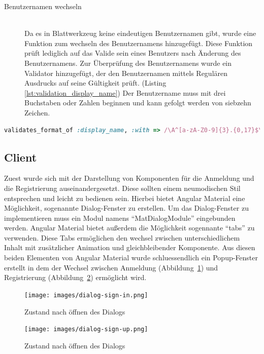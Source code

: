 \documentclass[paper=a4,fontsize=12pt,parskip=half]{scrartcl}
\begin{document}
\begin{description}
		\item[Benutzernamen wechseln]\hfill\\
		Da es in Blattwerkzeug keine eindeutigen Benutzernamen gibt, wurde eine Funktion zum wechseln des Benutzernamens hinzugefügt. Diese Funktion prüft lediglich auf das Valide sein eines Benutzers nach Änderung des Benutzernamens. Zur Überprüfung des Benutzernamens wurde ein Validator hinzugefügt, der den Benutzernamen mittels Regulären Ausdrucks auf seine Gültigkeit prüft. (Listing \ref{lst:validation_display_name}) Der Benutzername muss mit drei Buchstaben oder Zahlen beginnen und kann gefolgt werden von siebzehn Zeichen. 
	\end{description}

	\begin{lstlisting}[language=Ruby, style=CodeView, caption=Validierung des Benutzernamens, captionpos=b, label={lst:validation_display_name},float,floatplacement=H]
		validates_format_of :display_name, :with => /\A^[a-zA-Z0-9]{3}.{0,17}$\z/i
	\end{lstlisting}

	\subsection{Client}
	\label{sec: client}
	Zuest wurde sich mit der Darstellung von Komponenten für die Anmeldung und die Registrierung auseinandergesetzt. Diese sollten einem neumodischen Stil entsprechen und leicht zu bedienen sein. Hierbei bietet Angular Material eine Möglichkeit, sogenannte Dialog-Fenster zu erstellen. Um das Dialog-Fenster zu implementieren muss ein Modul namens \enquote{MatDialogModule} eingebunden werden. Angular Material bietet außerdem die Möglichkeit sogennante \enquote{tabs} zu verwenden. Diese Tabs ermöglichen den wechsel zwischen unterschiedlichem Inhalt mit zusätzlicher Animation und gleichbleibender Komponente. Aus diesen beiden Elementen von Angular Material wurde schluessendlich ein Popup-Fenster erstellt in dem der Wechsel zwischen Anmeldung (Abbildung~\ref{fig:dialog_sign_in}) und Registrierung (Abbildung~\ref{fig:dialog_sign_up}) ermöglicht wird.

	\begin{figure}
		\texttt{[image: images/dialog-sign-in.png]}
		\caption{Zustand nach öffnen des Dialogs}
		\label{fig:dialog_sign_in}
	\end{figure}

	\begin{figure}
		\texttt{[image: images/dialog-sign-up.png]}
		\caption{Zustand nach öffnen des Dialogs}
		\label{fig:dialog_sign_up}
	\end{figure}
\end{document}
